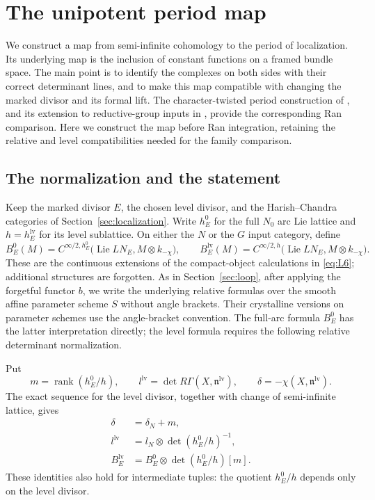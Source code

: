 \section{The unipotent period map}\label{sec:unipotent}

We construct a map from semi-infinite cohomology to the period of
localization.  Its underlying map is the inclusion of constant functions
on a framed bundle space.  The main point is to identify the complexes
on both sides with their correct determinant lines, and to make this map
compatible with changing the marked divisor and its formal lift.
The character-twisted period construction of
\cite[Section~12.5.17 and Theorem~12.5.18]{GLCII}, and its extension to
reductive-group inputs in \cite[Theorem~12.8.8]{GLCII}, provide the
corresponding Ran comparison.  Here we construct the map before Ran
integration, retaining the relative and level compatibilities needed
for the family comparison.

\subsection{The normalization and the statement}

Keep the marked divisor $E$, the chosen level divisor, and the
Harish--Chandra categories of Section~\ref{sec:localization}.  Write
$h_E^0$ for the full $N_0$ arc Lie lattice and
$h=h_E^{\mathrm{lv}}$ for its level sublattice.  On either the $N$ or
the $G$ input category, define
\[
 B_E^0(M)=C^{\infty/2,h_E^0}
       \bigl(\operatorname{Lie}LN_E,M\otimes k_{-\chi}\bigr),
 \qquad
 B_E^{\mathrm{lv}}(M)=C^{\infty/2,h}
       \bigl(\operatorname{Lie}LN_E,M\otimes k_{-\chi}\bigr).
\]
These are the continuous extensions of the compact-object calculations
in \eqref{eq:L6}; additional structures are forgotten.  As in
Section~\ref{sec:loop}, after applying the forgetful functor $b$, we write the underlying
relative formulas over the smooth affine parameter scheme $S$ without
angle brackets.  Their crystalline versions on parameter
schemes use the angle-bracket convention.  The full-arc formula
$B_E^0$ has the latter interpretation directly; the level formula
requires the following relative determinant normalization.

Put
\[
 m=\operatorname{rank}(h_E^0/h),\qquad
 l^{\mathrm{lv}}=\det R\Gamma(X,\mathfrak n^{\mathrm{lv}}),\qquad
 \delta=-\chi(X,\mathfrak n^{\mathrm{lv}}).
\]
The exact sequence for the level divisor, together with change of
semi-infinite lattice, gives
\begin{equation}\label{eq:T9}
 \begin{aligned}
 \delta&=\delta_N+m,\\
 l^{\mathrm{lv}}
   &=l_N\otimes\det(h_E^0/h)^{-1},\\
 B_E^{\mathrm{lv}}
   &=B_E^0\otimes\det(h_E^0/h)[m].
 \end{aligned}
\end{equation}
These identities also hold for intermediate tuples: the quotient
$h_E^0/h$ depends only on the level divisor.

